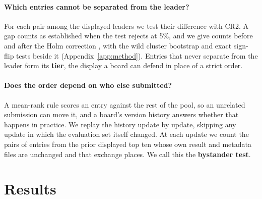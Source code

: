\documentclass{article}
\begin{document}
\paragraph{Which entries cannot be separated from the leader?} For each pair among the
displayed leaders we test their difference with CR2. A gap counts as established when the
test rejects at 5\%, and we give counts before and after the Holm correction
\citep{holm1979}, with the wild cluster bootstrap \citep{cameron2008} and exact sign-flip
tests beside it (Appendix~\ref{app:method}). Entries that never separate from the leader form its \textbf{tier}, the display a
board can defend in place of a strict order.

\paragraph{Does the order depend on who else submitted?} A mean-rank rule scores an entry
against the rest of the pool, so an unrelated submission can move it, and a board's version
history answers whether that happens in practice. We replay the history update by update,
skipping any update in which the evaluation set itself changed. At each update we count the
pairs of entries from the prior displayed top ten whose own result and metadata files are
unchanged and that exchange places. We call this the \textbf{bystander test}.

\section{Results}
\label{sec:boards}
\end{document}
